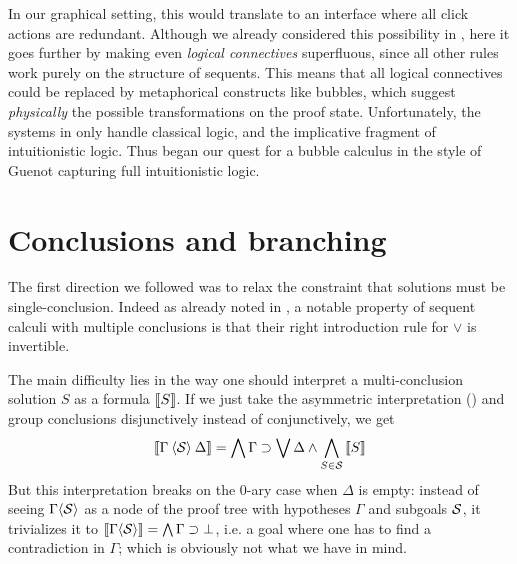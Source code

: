 In our graphical setting, this would translate to an interface where all click
actions are redundant. Although we already considered this possibility in
, here it goes further by making even \emph{logical
connectives} superfluous, since all other rules work purely on the structure of
sequents. This means that all logical connectives could be replaced by
metaphorical constructs like bubbles, which suggest \emph{physically} the
possible transformations on the proof state.
Unfortunately, the systems in \cite{guenot_nested_2013} only handle classical
logic, and the implicative fragment of intuitionistic logic. Thus began our
quest for a bubble calculus in the style of Guenot capturing full intuitionistic
logic.


\section{Conclusions and branching}

The first direction we followed was to relax the constraint that solutions must
be single-conclusion. Indeed as already noted in , a
notable property of sequent calculi with multiple conclusions is that their
right introduction rule for $\lor$ is invertible.

The main difficulty lies in the way one should interpret a multi-conclusion
solution $S$ as a formula $\left\llbracket S \right\rrbracket$. If we just take the asymmetric
interpretation () and group conclusions disjunctively instead of
conjunctively, we get
$$
\left\llbracket \Gamma \mathbin{\langle \mathcal{S} \rangle} \Delta \right\rrbracket =
\bigwedge \Gamma \supset \bigvee \Delta \land \bigwedge_{S \in \mathcal{S}}{\left\llbracket S \right\rrbracket}
$$
But this interpretation breaks on the 0-ary case when $\Delta$ is empty: instead
of seeing $\Gamma \mathbin{\langle \mathcal{S} \rangle}$ as a node of the proof tree with hypotheses
$\Gamma$ and subgoals $\mathcal{S}$, it trivializes it to $\left\llbracket \Gamma
\mathbin{\langle \mathcal{S} \rangle} \right\rrbracket = \bigwedge \Gamma \supset \bot$, i.e. a goal where one has to
find a contradiction in $\Gamma$; which is obviously not what we have in mind.

